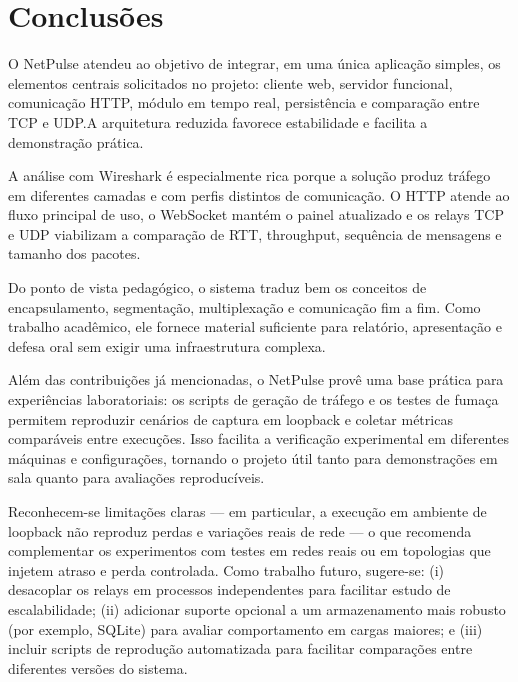\documentclass[conference]{IEEEtran}
\begin{document}
\section{Conclusões}
O NetPulse atendeu ao objetivo de integrar, em uma única aplicação simples, os elementos centrais solicitados no projeto: cliente web, servidor funcional, comunicação HTTP, módulo em tempo real, persistência e comparação entre TCP e UDP.\@ A arquitetura reduzida favorece estabilidade e facilita a demonstração prática.

A análise com Wireshark é especialmente rica porque a solução produz tráfego em diferentes camadas e com perfis distintos de comunicação. O HTTP atende ao fluxo principal de uso, o WebSocket mantém o painel atualizado e os relays TCP e UDP viabilizam a comparação de RTT, throughput, sequência de mensagens e tamanho dos pacotes.

Do ponto de vista pedagógico, o sistema traduz bem os conceitos de encapsulamento, segmentação, multiplexação e comunicação fim a fim. Como trabalho acadêmico, ele fornece material suficiente para relatório, apresentação e defesa oral sem exigir uma infraestrutura complexa.

Além das contribuições já mencionadas, o NetPulse provê uma base prática para experiências laboratoriais: os scripts de geração de tráfego e os testes de fumaça permitem reproduzir cenários de captura em loopback e coletar métricas comparáveis entre execuções. Isso facilita a verificação experimental em diferentes máquinas e configurações, tornando o projeto útil tanto para demonstrações em sala quanto para avaliações reproducíveis.

Reconhecem-se limitações claras — em particular, a execução em ambiente de loopback não reproduz perdas e variações reais de rede — o que recomenda complementar os experimentos com testes em redes reais ou em topologias que injetem atraso e perda controlada. Como trabalho futuro, sugere-se: (i) desacoplar os relays em processos independentes para facilitar estudo de escalabilidade; (ii) adicionar suporte opcional a um armazenamento mais robusto (por exemplo, SQLite) para avaliar comportamento em cargas maiores; e (iii) incluir scripts de reprodução automatizada para facilitar comparações entre diferentes versões do sistema.
\end{document}
